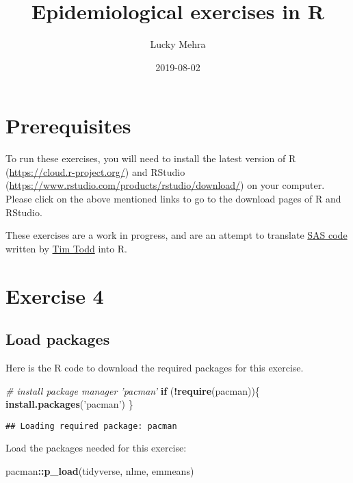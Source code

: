 \documentclass[]{book}
\title{Epidemiological exercises in R}
\author{Lucky Mehra}
\date{2019-08-02}
\newenvironment{Shaded}{\begin{snugshade}}{\end{snugshade}}
\newcommand{\CommentTok}[1]{\textcolor[rgb]{0.56,0.35,0.01}{\textit{#1}}}
\newcommand{\ControlFlowTok}[1]{\textcolor[rgb]{0.13,0.29,0.53}{\textbf{#1}}}
\newcommand{\KeywordTok}[1]{\textcolor[rgb]{0.13,0.29,0.53}{\textbf{#1}}}
\newcommand{\NormalTok}[1]{#1}
\newcommand{\OperatorTok}[1]{\textcolor[rgb]{0.81,0.36,0.00}{\textbf{#1}}}
\newcommand{\StringTok}[1]{\textcolor[rgb]{0.31,0.60,0.02}{#1}}
\begin{document}
\maketitle

{
\setcounter{tocdepth}{1}
\tableofcontents
}
\hypertarget{prerequisites}{%
\chapter*{Prerequisites}\label{prerequisites}}

To run these exercises, you will need to install the latest version of R (\url{https://cloud.r-project.org/}) and RStudio (\url{https://www.rstudio.com/products/rstudio/download/}) on your computer. Please click on the above mentioned links to go to the download pages of R and RStudio.

These exercises are a work in progress, and are an attempt to translate \protect\hyperlink{sascode}{SAS code} written by \href{https://www.plantpath.k-state.edu/people/faculty/todd-timothy/}{Tim Todd} into R.

\hypertarget{ex4}{%
\chapter{Exercise 4}\label{ex4}}

\hypertarget{load-packages}{%
\section{Load packages}\label{load-packages}}

Here is the R code to download the required packages for this exercise.

\begin{Shaded}
\begin{Highlighting}[]
\CommentTok{# install package manager 'pacman'}
\ControlFlowTok{if}\NormalTok{ (}\OperatorTok{!}\KeywordTok{require}\NormalTok{(pacman))\{}
  \KeywordTok{install.packages}\NormalTok{(}\StringTok{'pacman'}\NormalTok{)}
\NormalTok{\}}
\end{Highlighting}
\end{Shaded}

\begin{verbatim}
## Loading required package: pacman
\end{verbatim}

Load the packages needed for this exercise:

\begin{Shaded}
\begin{Highlighting}[]
\NormalTok{pacman}\OperatorTok{::}\KeywordTok{p_load}\NormalTok{(tidyverse, }
\NormalTok{       nlme, }
\NormalTok{       emmeans)}
\end{Highlighting}
\end{Shaded}
\end{document}
